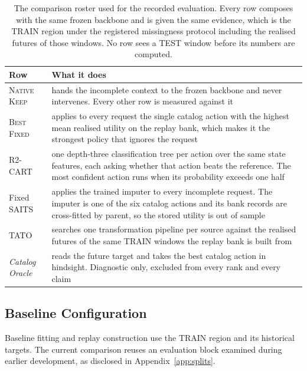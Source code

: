 \documentclass{article}
\begin{document}
\begin{table}[htbp]
  \caption{The comparison roster used for the recorded evaluation. Every row composes with
  the same frozen backbone and is given the same evidence, which is the TRAIN region under the
  registered missingness protocol including the realised futures of those windows. No row sees
  a TEST window before its numbers are computed.}
  \label{tab:app-roster}
  \centering
  \small
  \setlength{\tabcolsep}{4pt}
\begin{tabular}{@{}l p{}@{}}
    \toprule
    Row & What it does \\
    \midrule
    \textsc{Native Keep} & hands the incomplete context to the frozen backbone and never intervenes. Every other row is measured against it \\
    \textsc{Best Fixed} & applies to every request the single catalog action with the highest mean realised utility on the replay bank, which makes it the strongest policy that ignores the request \\
    R2-CART & one depth-three classification tree per action over the same state features, each asking whether that action beats the reference. The most confident action runs when its probability exceeds one half \\
    Fixed SAITS & applies the trained imputer to every incomplete request. The imputer is one of the six catalog actions and its bank records are cross-fitted by parent, so the stored utility is out of sample \\
    TATO & searches one transformation pipeline per source against the realised futures of the same TRAIN windows the replay bank is built from \\
    \emph{Catalog Oracle} & reads the future target and takes the best catalog action in hindsight. Diagnostic only, excluded from every rank and every claim \\
    \bottomrule
  \end{tabular}
\end{table}

\subsection{Baseline Configuration}
\label{app:baseline-config}
Baseline fitting and replay construction use the TRAIN region and its historical targets.
The current comparison reuses an evaluation block examined during earlier development, as
disclosed in Appendix~\ref{app:splits}.
\end{document}
